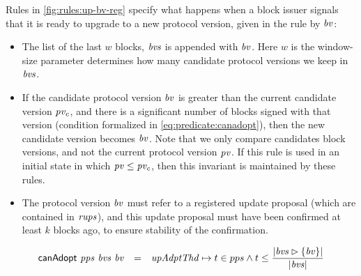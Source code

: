 Rules in \cref{fig:rules:up-bv-reg} specify what happens when a block issuer
signals that it is ready to upgrade to a new protocol version, given in the
rule by $\mathit{bv}$:
\begin{itemize}
\item The list of the last $w$ blocks, $\mathit{bvs}$ is appended with $\mathit{bv}$.
  Here $w$ is the window-size parameter determines how many candidate protocol
  versions we keep in $\mathit{bvs}$.
\item If the candidate protocol version $\mathit{bv}$ is greater than the current
  candidate version $\mathit{pv_c}$, and there is a significant number of blocks
  signed with that version (condition formalized in
  \cref{eq:predicate:canadopt}), then the new candidate version becomes
  $\mathit{bv}$. Note that we only compare candidates block versions, and not the
  current protocol version $\mathit{pv}$. If this rule is used in an initial state
  in which $\mathit{pv} \leq \mathit{pv_c}$, then this invariant is maintained by
  these rules.
\item The protocol version $\mathit{bv}$ must refer to a registered update
  proposal (which are contained in $\mathit{rups}$), and this update proposal must
  have been confirmed at least $k$ blocks ago, to ensure stability of the
  confirmation.
\end{itemize}

\begin{equation}
  \label{eq:predicate:canadopt}
  \begin{array}{r c l}
    \mathsf{canAdopt}~\mathit{pps}~\mathit{bvs}~\mathit{bv}
    & =
    & \mathit{upAdptThd} \mapsto t \in pps \wedge
    t \leq \dfrac{\left| \mathit{bvs} \rhd \{\mathit{bv}\} \right|}{\left| \mathit{bvs} \right|}\\
  \end{array}
\end{equation}

